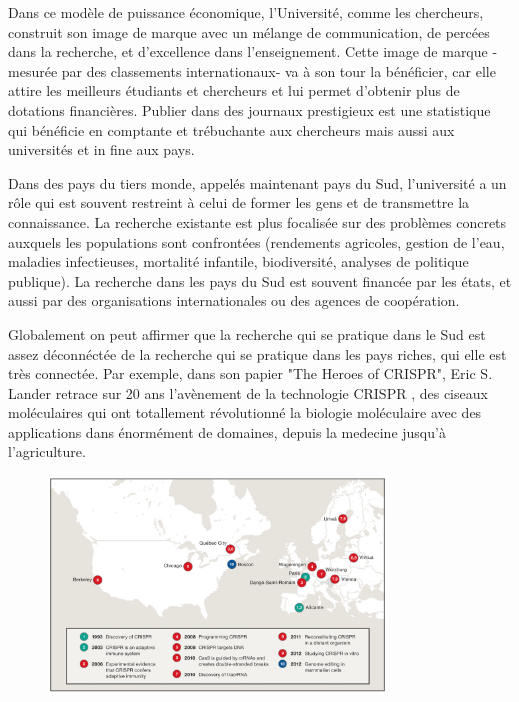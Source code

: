 \documentclass[24pt]{article}
\begin{document}
Dans ce modèle de puissance économique, l'Université, comme les chercheurs, construit son image de marque avec 
un mélange de communication, de percées dans la recherche, et d'excellence dans l'enseignement.
Cette image de marque -mesurée par des classements internationaux- va à son tour la bénéficier, car elle attire les meilleurs étudiants et chercheurs et lui permet d'obtenir plus de dotations financières.
Publier dans des journaux prestigieux est une statistique qui bénéficie en comptante et trébuchante aux chercheurs mais aussi aux universités et in fine aux pays. 

Dans des pays du tiers monde, appelés maintenant pays du Sud, l'université a un rôle qui est souvent restreint à celui de former les gens et de transmettre la connaissance. La recherche existante  est plus focalisée sur des problèmes concrets auxquels les populations sont confrontées (rendements agricoles, gestion de l'eau, maladies infectieuses, mortalité infantile, biodiversité, analyses de politique publique). La recherche dans les pays du Sud est souvent financée par les états, et aussi par des organisations internationales ou des agences de coopération. 

Globalement on peut affirmer que la recherche qui se pratique dans le Sud est assez déconnéctée de la recherche qui se pratique dans les pays riches, qui elle est très connectée. Par exemple, dans son papier "The Heroes of CRISPR", Eric S. Lander  retrace sur 20 ans l'avènement de la technologie CRISPR , des ciseaux moléculaires qui ont totallement révolutionné la biologie moléculaire avec des applications dans énormément de domaines, depuis la medecine jusqu'à l'agriculture.

\begin{figure}[h]
    \centering
    \includegraphics[width=0.8\textwidth]{Map.png}
    \caption{}
    \label{fig:my_label}
\end{figure}
\end{document}
